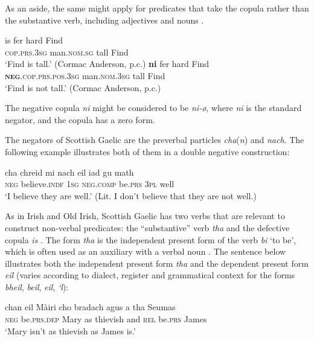 \documentclass[output=paper,colorlinks,citecolor=brown]{langscibook}
\begin{document}
\begin{paperappendix}
\begin{unindented}
As an aside, the same might apply for predicates that take the copula rather than the substantive verb, including adjectives and nouns \citep[39]{McCone2005}.
%
\begin{exe}\ex \gll is fer hard Find \\
\textsc{cop.prs.3sg} man.\textsc{nom.sg} tall   Find \\
    \glt `Find is tall.' (Cormac Anderson, p.c.)
\ex \gll \textbf{ni} fer hard Find \\
\textbf{\textsc{neg}}\textsc{.cop.prs.pos.3sg} man.\textsc{nom.3sg} tall   Find \\
    \glt `Find is not tall.' (Cormac Anderson, p.c.)
    \end{exe}

The negative copula \textit{ni} might be considered to be \textit{ni-ø}, where \textit{ni} is the standard negator, and the copula has a zero form. 


The negators of Scottish Gaelic are the preverbal particles
\textit{cha}(\textit{n}) and \textit{nach}. The following example illustrates both of them in a double negative construction:
%
\begin{exe}\ex \gll cha chreid mi  nach eil iad {gu math} \\
\textsc{neg} believe.\textsc{indf} \textsc{1sg} \textsc{neg.comp} be.\textsc{prs} \textsc{3pl} well \\
    \glt `I believe they are well.' (Lit. I don’t believe that they are not well.) \citep[61]{Lamb2001}
    \end{exe}

As in Irish and Old Irish, Scottish Gaelic has two verbs that are relevant
to construct non-verbal predicates: the ``substantive'' verb \textit{tha} and the defective copula \textit{is} \citep[65]{Lamb2001}. The form \textit{tha} is the independent present form of the verb \textit{bi} `to be', which is often used as an auxiliary with a verbal noun \citep[54]{Lamb2001}. The sentence below illustrates both the independent present form \textit{tha} and the dependent present form \textit{eil} (varies according to dialect, register and grammatical context for the forms \textit{bheil}, \textit{beil}, \textit{eil}, \textit{‘l}): 
%
\begin{exe}\ex \gll chan eil Màiri cho bradach agus a tha Seumas \\
\textsc{neg}  be.\textsc{prs.dep} Mary  as    thievish and   \textsc{rel} be.\textsc{prs} James \\
    \glt `Mary isn't as thievish as James is.' \citep[42]{Lamb2001}
    \end{exe}


\end{unindented}
\end{paperappendix}
\end{document}
